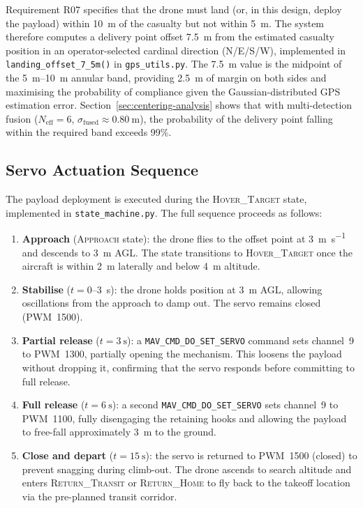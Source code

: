 Requirement R07 specifies that the drone must land (or, in this design, deploy the payload) within \SI{10}{\metre} of the casualty but not within \SI{5}{\metre}. The system therefore computes a delivery point offset \SI{7.5}{\metre} from the estimated casualty position in an operator-selected cardinal direction (N/E/S/W), implemented in \texttt{landing\_offset\_7\_5m()} in \texttt{gps\_utils.py}. The \SI{7.5}{\metre} value is the midpoint of the \SIrange{5}{10}{\metre} annular band, providing \SI{2.5}{\metre} of margin on both sides and maximising the probability of compliance given the Gaussian-distributed GPS estimation error. Section~\ref{sec:centering-analysis} shows that with multi-detection fusion ($N_\text{eff} = 6$, $\sigma_\text{fused} \approx \SI{0.80}{\metre}$), the probability of the delivery point falling within the required band exceeds 99\%.

\subsection{Servo Actuation Sequence}

The payload deployment is executed during the \textsc{Hover\_Target} state, implemented in \texttt{state\_machine.py}. The full sequence proceeds as follows:

\begin{enumerate}
    \item \textbf{Approach} (\textsc{Approach} state): the drone flies to the offset point at \SI{3}{\metre\per\second} and descends to \SI{3}{\metre} AGL. The state transitions to \textsc{Hover\_Target} once the aircraft is within \SI{2}{\metre} laterally and below \SI{4}{\metre} altitude.

    \item \textbf{Stabilise} ($t = 0$--\SI{3}{\second}): the drone holds position at \SI{3}{\metre} AGL, allowing oscillations from the approach to damp out. The servo remains closed (PWM~1500).

    \item \textbf{Partial release} ($t = \SI{3}{\second}$): a \texttt{MAV\_CMD\_DO\_SET\_SERVO} command sets channel~9 to PWM~1300, partially opening the mechanism. This loosens the payload without dropping it, confirming that the servo responds before committing to full release.

    \item \textbf{Full release} ($t = \SI{6}{\second}$): a second \texttt{MAV\_CMD\_DO\_SET\_SERVO} sets channel~9 to PWM~1100, fully disengaging the retaining hooks and allowing the payload to free-fall approximately \SI{3}{\metre} to the ground.

    \item \textbf{Close and depart} ($t = \SI{15}{\second}$): the servo is returned to PWM~1500 (closed) to prevent snagging during climb-out. The drone ascends to search altitude and enters \textsc{Return\_Transit} or \textsc{Return\_Home} to fly back to the takeoff location via the pre-planned transit corridor.
\end{enumerate}

